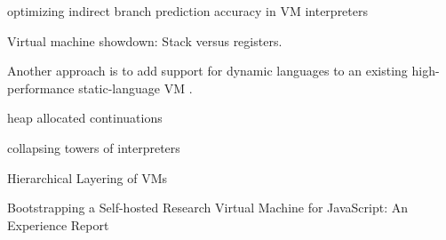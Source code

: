 \cite{branch-predict:03} optimizing indirect branch prediction
accuracy in VM interpreters

Virtual machine showdown: Stack versus registers.

Another approach is to add support for dynamic languages to an
existing high-performance static-language VM \cite{stJITdyn:12,
  dynStatComp:12}.

heap allocated continuations \cite{whatever:19, compWithContLLVM:16}

collapsing towers of interpreters \cite{collapse:17}

Hierarchical Layering of VMs \cite{layering:09}

Bootstrapping a Self-hosted Research Virtual Machine for JavaScript:
An Experience Report \cite{self-hostJSvm:11}







